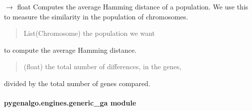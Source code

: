\documentclass[letterpaper,10pt,english]{sphinxmanual}
\begin{document}
\begin{fulllineitems}
\label{\detokenize{pygenalgo.engines:pygenalgo.engines.auxiliary.avg_hamming_dist}}
\pysigstartsignatures
\pysiglinewithargsret
{}
{}
{{ $\rightarrow$ float}}
\pysigstopsignatures
\sphinxAtStartPar
Computes the average Hamming distance of a population. We use
this to measure the similarity in the population of chromosomes.
\begin{quote}\begin{description}
\sphinxAtStartPar
{} \textendash{} List(Chromosome) the population we want

\end{description}\end{quote}

\sphinxAtStartPar
to compute the average Hamming distance.
\begin{quote}\begin{description}
\sphinxAtStartPar
(float) the total number of differences, in the genes,

\end{description}\end{quote}

\sphinxAtStartPar
divided by the total number of genes compared.

\end{fulllineitems}



\paragraph{pygenalgo.engines.generic\_ga module}
\label{\detokenize{pygenalgo.engines:module-pygenalgo.engines.generic_ga}}\label{\detokenize{pygenalgo.engines:pygenalgo-engines-generic-ga-module}}
\end{document}
